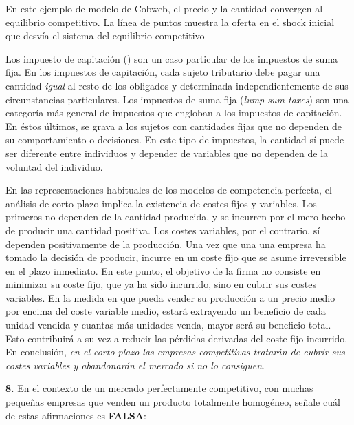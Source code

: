 \documentclass{nuevotema}
\begin{document}
En este ejemplo de modelo de Cobweb, el precio y la cantidad convergen al equilibrio competitivo. La línea de puntos muestra la oferta en el shock inicial que desvía el sistema del equilibrio competitivo

\conceptos


Los impuesto de capitación () son un caso particular de los impuestos de suma fija. En los impuestos de capitación, cada sujeto tributario debe pagar una cantidad \textit{igual} al resto de los obligados y determinada independientemente de sus circunstancias particulares. Los impuestos de suma fija (\textit{lump-sum taxes}) son una categoría más general de impuestos que engloban a los impuestos de capitación. En éstos últimos, se grava a los sujetos con cantidades fijas que no dependen de su comportamiento o decisiones. En este tipo de impuestos, la cantidad sí puede ser diferente entre individuos y depender de variables que no dependen de la voluntad del individuo. 


En las representaciones habituales de los modelos de competencia perfecta, el análisis de corto plazo implica la existencia de costes fijos y variables. Los primeros no dependen de la cantidad producida, y se incurren por el mero hecho de producir una cantidad positiva. Los costes variables, por el contrario, sí dependen positivamente de la producción. Una vez que una una empresa ha tomado la decisión de producir, incurre en un coste fijo que se asume irreversible en el plazo inmediato. En este punto, el objetivo de la firma no consiste en minimizar su coste fijo, que ya ha sido incurrido, sino en cubrir sus costes variables. En la medida en que pueda vender su producción a un precio medio por encima del coste variable medio, estará extrayendo un beneficio de cada unidad vendida y cuantas más unidades venda, mayor será su beneficio total. Esto contribuirá a su vez a reducir las pérdidas derivadas del coste fijo incurrido. En conclusión, \textit{en el corto plazo las empresas competitivas tratarán de cubrir sus costes variables y abandonarán el mercado si no lo consiguen}.


\preguntas

\textbf{8.} En el contexto de un mercado perfectamente competitivo, con muchas pequeñas empresas que venden un producto totalmente homogéneo, señale cuál de estas afirmaciones es \textbf{FALSA}:
\end{document}
